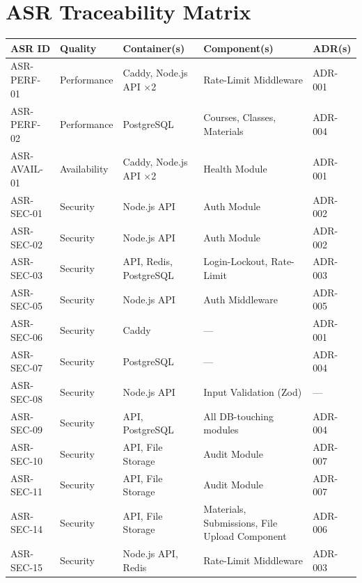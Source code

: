 \documentclass[12pt,a4paper]{article}
\begin{document}
\section{ASR Traceability Matrix}

\begingroup
\small
\begin{longtable}{L{2cm} L{2cm} L{3.5cm} L{3.5cm} L{2.5cm}}
  \toprule
  \textbf{ASR ID} & \textbf{Quality} & \textbf{Container(s)} & \textbf{Component(s)} & \textbf{ADR(s)} \\
  \midrule
  \endhead
  \bottomrule
  \endlastfoot

  ASR-PERF-01 & Performance & Caddy, Node.js API $\times$2 & Rate-Limit Middleware & ADR-001 \\
  ASR-PERF-02 & Performance & PostgreSQL & Courses, Classes, Materials & ADR-004 \\
  ASR-AVAIL-01 & Availability & Caddy, Node.js API $\times$2 & Health Module & ADR-001 \\
  ASR-SEC-01 & Security & Node.js API & Auth Module & ADR-002 \\
  ASR-SEC-02 & Security & Node.js API & Auth Module & ADR-002 \\
  ASR-SEC-03 & Security & API, Redis, PostgreSQL & Login-Lockout, Rate-Limit & ADR-003 \\
  ASR-SEC-05 & Security & Node.js API & Auth Middleware & ADR-005 \\
  ASR-SEC-06 & Security & Caddy & --- & ADR-001 \\
  ASR-SEC-07 & Security & PostgreSQL & --- & ADR-004 \\
  ASR-SEC-08 & Security & Node.js API & Input Validation (Zod) & --- \\
  ASR-SEC-09 & Security & API, PostgreSQL & All DB-touching modules & ADR-004 \\
  ASR-SEC-10 & Security & API, File Storage & Audit Module & ADR-007 \\
  ASR-SEC-11 & Security & API, File Storage & Audit Module & ADR-007 \\
  ASR-SEC-14 & Security & API, File Storage & Materials, Submissions, File Upload Component & ADR-006 \\
  ASR-SEC-15 & Security & Node.js API, Redis & Rate-Limit Middleware & ADR-003 \\
\end{longtable}
\endgroup
\end{document}
